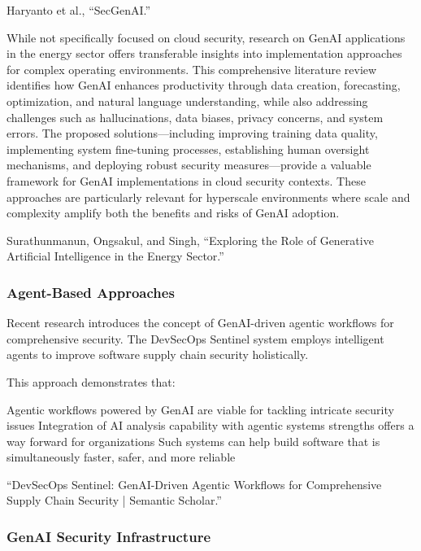 Haryanto et al., “SecGenAI.”

While not specifically focused on cloud security, research on GenAI applications in the energy sector offers transferable insights into implementation approaches for complex operating environments. This comprehensive literature review identifies how GenAI enhances productivity through data creation, forecasting, optimization, and natural language understanding, while also addressing challenges such as hallucinations, data biases, privacy concerns, and system errors.
The proposed solutions—including improving training data quality, implementing system fine-tuning processes, establishing human oversight mechanisms, and deploying robust security measures—provide a valuable framework for GenAI implementations in cloud security contexts. These approaches are particularly relevant for hyperscale environments where scale and complexity amplify both the benefits and risks of GenAI adoption.

Surathunmanun, Ongsakul, and Singh, “Exploring the Role of Generative Artificial Intelligence in the Energy Sector.”


\subsubsection{Agent-Based Approaches} %
\label{sec:Agent-Based Approaches}

Recent research introduces the concept of GenAI-driven agentic workflows for comprehensive security. The DevSecOps Sentinel system employs intelligent agents to improve software supply chain security holistically.

This approach demonstrates that:

Agentic workflows powered by GenAI are viable for tackling intricate security issues
Integration of AI analysis capability with agentic systems strengths offers a way forward for organizations
Such systems can help build software that is simultaneously faster, safer, and more reliable

“DevSecOps Sentinel: GenAI-Driven Agentic Workflows for Comprehensive Supply Chain Security | Semantic Scholar.”


\subsubsection{GenAI Security Infrastructure} %
\label{sec:GenAI Security Infrastructure}

